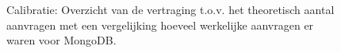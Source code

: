 \begin{figure}[htb!] 
	\centering
	\caption{Calibratie: Overzicht van de vertraging t.o.v. het theoretisch aantal aanvragen met een vergelijking hoeveel werkelijke aanvragen er waren voor MongoDB. }
	\label{fig:calibratie-queriesperseconde-mongodb}
\end{figure}

